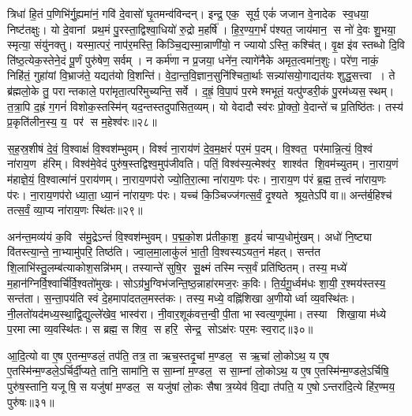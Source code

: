 त्रिधा॑ हि॒तं प॒णिभि॑र्गु॒ह्यमा॑नं॒ गवि॑ दे॒वासो॑ घृ॒तमन्व॑विन्दन्। इन्द्र॒ एक॒ सूर्य॒ एकं॑ जजान वे॒नादेक स्व॒धया॒ निष्ट॑तक्षुः। यो दे॒वानां प्रथ॒मं पु॒रस्ता॒द्विश्वा॒धियो॑ रु॒द्रो म॒हर्\mbox{}षि॑। हि॒र॒ण्य॒ग॒र्भं प॑श्यत॒ जाय॑मान॒ स नो॑ दे॒वः शु॒भया॒ स्मृत्या॒ संयु॑नक्तु। यस्मा॒त्परं॒ नाप॑र॒मस्ति॒ किञ्चि॒द्यस्मा॒न्नाणी॑यो॒ न ज्यायोऽस्ति॒ कश्चि॑त्। वृ॒क्ष इ॑व स्तब्धो दि॒वि ति॑ष्ठ॒त्येक॒स्तेने॒दं पू॒र्णं पुरु॑षेण॒ सर्वम्। न कर्म॑णा न प्र॒जया॒ धने॑न॒ त्यागे॑नैके अमृत॒त्वमा॑न॒शुः। परे॑ण॒ नाकं॒ निहि॑तं॒ गुहा॑यां वि॒भ्राज॑ते॒ यद्यत॑यो वि॒शन्ति॑। वे॒दा॒न्त॒वि॒ज्ञान॒सुनि॑श्चिता॒र्थाः सन्न्या॑सयो॒गाद्यत॑यः शुद्ध॒सत्त्वा। ते ब्र॑ह्मलो॒के तु॒ परान्तकाले॒ परा॑मृता॒त्परि॑मुच्यन्ति॒ सर्वे। द॒ह्रं॒ वि॒पा॒पं प॒रमेश्मभूतं॒ यत्पु॑ण्डरी॒कं पु॒रम॑ध्यस॒स्थम्। त॒त्रा॒पि द॒ह्रं ग॒गनं॑ विशोक॒स्तस्मि॑न् यद॒न्तस्तदुपा॑सित॒व्यम्। यो वेदादौ स्व॑रः प्रो॒क्तो॒ वे॒दान्ते॑ च प्र॒तिष्ठि॑तः। तस्य॑ प्र॒कृति॑लीन॒स्य॒ य॒ पर॑ स म॒हेश्व॑रः॥२८॥
\anuvakamend

स॒ह॒स्र॒शी\sr{}षं दे॒वं॒ वि॒श्वाक्षं॑ वि॒श्वश॑म्भुवम्। विश्वं॑ ना॒राय॑णं दे॒व॒म॒क्षरं॑ पर॒मं प॒दम्। 
वि॒श्वत॒ पर॑मान्नि॒त्यं॒ वि॒श्वं ना॑राय॒ण ह॑रिम्। विश्व॑मे॒वेदं पुरु॑ष॒स्तद्विश्व॒मुप॑जीवति। 
पतिं॒ विश्व॑स्य॒\aav{}\aav{}त्मेश्व॑र॒ शाश्व॑त शि॒वम॑च्युतम्। ना॒राय॒णं म॑हाज्ञे॒यं॒ वि॒श्वात्मा॑नं प॒राय॑णम्। ना॒राय॒णप॑रो ज्यो॒ति॒रा॒त्मा ना॑राय॒णः प॑रः। ना॒राय॒ण प॑रं ब्र॒ह्म॒ त॒त्त्वं ना॑राय॒णः प॑रः। ना॒राय॒णप॑रो ध्या॒ता॒ ध्या॒नं ना॑राय॒णः प॑रः। यच्च॑ कि॒ञ्चिज्ज॑गत्स॒र्वं॒ दृ॒श्यते श्रूय॒तेऽपि॑ वा॥ अन्त॑र्ब॒हिश्च॑ तत्स॒र्वं॒ व्या॒प्य ना॑राय॒णः स्थि॑तः॥२९॥

 अन॑न्त॒मव्य॑यं क॒वि स॑मु॒द्रेऽन्तं॑ वि॒श्वश॑म्भुवम्। प॒द्म॒को॒श प्र॑तीका॒श॒ हृ॒दयं॑ चाप्य॒धोमु॑खम्। अधो॑ नि॒ष्ट्या वि॑तस्त्या॒न्ते॒ ना॒भ्यामु॑परि॒ तिष्ठ॑ति। ज्वा॒ल॒मा॒लाकु॑लं भा॒ती॒ वि॒श्वस्यऽ\sav{}यत॒नं म॑हत्। सन्त॑त शि॒लाभि॑स्तु॒\-लम्ब॑त्याकोश॒सन्नि॑भम्। तस्यान्ते॑ सुषि॒र सू॒क्ष्मं तस्मिन्त्स॒र्वं प्रति॑ष्ठितम्। तस्य॒ मध्ये॑ म॒हान॑\-ग्निर्वि॒श्वार्चि॑र्वि॒श्वतो॑मुखः। सोऽग्र॑भु॒ग्विभ॑जन्ति॒ष्ठ॒न्नाहा॑रमज॒रः क॒विः। ति॒र्य॒गू॒र्ध्वम॑धः शा॒यी॒ र॒श्मय॑स्तस्य॒ सन्त॑ता। स॒न्ता॒पय॑ति स्वं दे॒हमापा॑दतल॒मस्त॑कः। तस्य॒ मध्ये॒ वह्नि॑शिखा अ॒णीयोर्ध्वा व्य॒वस्थि॑तः। नी॒लतो॑यद॑\-मध्य॒स्था॒द्वि॒द्युल्ले॑खेव॒ भास्व॑रा। नी॒वार॒शूक॑वत्त॒न्वी॒ पी॒ता भास्वत्य॒णूप॑मा। तस्या शिखा॒या म॑ध्ये प॒रमात्मा व्य॒वस्थि॑तः। स ब्रह्म॒ स शिव॒ स हरि॒ सेन्द्र॒ सोऽक्ष॑रः पर॒मः स्व॒राट्॥३०॥
\anuvakamend[ना॒रा॒य॒णः स्थि॑तो व्य॒वस्थि॑तश्च॒त्वारि॑ च]

आ॒दि॒त्यो वा ए॒ष ए॒तन्म॒ण्डलं॒ तप॑ति॒ तत्र॒ ता ऋच॒स्तदृ॒चां म॒ण्डल॒ स ऋ॒चां लो॒कोऽथ॒ य ए॒ष ए॒तस्मि॑न्म॒ण्डले॒ऽर्चिर्दी॒प्यते॒ तानि॒ सामा॑नि॒ स सा॒म्नां म॒ण्डल॒ स सा॒म्नां लो॒कोऽथ॒ य ए॒ष ए॒तस्मि॑न्म॒ण्डले॒ऽर्चिषि॒ पुरु॑ष॒स्तानि॒ यजूषि॒ स यजु॑षां म॒ण्डल॒ स यजु॑षां लो॒कः सैषा त्र॒य्येव॑ वि॒द्या त॑पति॒ य ए॒षोऽन्तरा॑दि॒त्ये हि॑र॒ण्मय॒ पुरु॑षः॥३१॥
\anuvakamend


